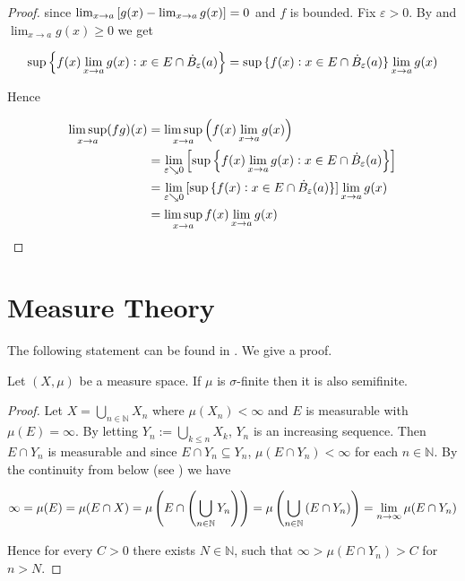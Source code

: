 \begin{appendix}
\begin{proof}
		\noindent since $\lim_{x \to a}\sbr[0]{ g(x) - \lim_{x \to a} g(x)} = 0$ and $f$ is bounded. Fix $\varepsilon > 0$. By \cite[357]{bourbaki:general_topology:1995} and $\lim_{x \to a}g(x) \geq 0$ we get 

		\begin{equation*}
			\sup\cbr[2]{ f(x)\lim_{x \to a}g(x) : x \in E \cap \dot{B}_\varepsilon(a)} = \sup\cbr[0]{ f(x) : x \in E \cap \dot{B}_\varepsilon(a)}\lim_{x \to a}g(x)
		\end{equation*}

		Hence

		\begin{equation*}
			\begin{aligned}
				\limsup_{x \to a} (fg)(x) &= \limsup_{x \to a}\del[2]{ f(x) \lim_{x \to a}g(x) }\\
				&= \lim_{\varepsilon \searrow 0} \sbr[2]{ \sup\cbr[2]{ f(x)\lim_{x \to a}g(x) : x \in E \cap \dot{B}_\varepsilon(a)}}\\
				&= \lim_{\varepsilon \searrow 0} \sbr[0]{ \sup\cbr[0]{ f(x) : x \in E \cap \dot{B}_\varepsilon(a)}}\lim_{x \to a}g(x)\\
				&= \limsup_{x \to a}f(x) \lim_{x \to a} g(x)
			\end{aligned}
		\end{equation*}
	\end{proof}

	\section{Measure Theory}
	The following statement can be found in \cite[27]{folland:real_analysis:1999}. We give a proof.	

		\begin{lemma}
			Let $(X,\mu)$ be a measure space. If $\mu$ is $\sigma$-finite then it is also semifinite.
		\end{lemma}

		\begin{proof}
			Let $X = \bigcup_{n \in \mathbb{N}} X_n$ where $\mu(X_n) < \infty$ and $E$ is measurable with $\mu(E) = \infty$. By letting $Y_n := \bigcup_{k \leq n} X_k$, $Y_n$ is an increasing sequence. Then $E \cap Y_n$ is measurable and since $E \cap Y_n \subseteq Y_n$, $\mu(E \cap Y_n) < \infty$ for each $n \in \mathbb{N}$. By the continuity from below (see \cite[26]{folland:real_analysis:1999}) we have

			\begin{equation*}
				\infty = \mu(E) = \mu(E \cap X) = \mu\del[4]{E \cap \del[4]{\bigcup_{n \in \mathbb{N}} Y_n}} = \mu\del[4]{\bigcup_{n \in \mathbb{N}} \del[0]{ E \cap Y_n}} = \lim\limits_{n \rightarrow \infty} \mu( E \cap Y_n )
			\end{equation*}

			Hence for every $C > 0$ there exists $N \in \mathbb{N}$, such that $\infty > \mu(E \cap Y_n) > C$ for $n > N$.
		\end{proof}

\end{appendix}

\printbibliography

